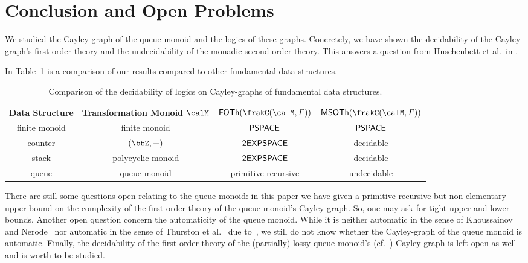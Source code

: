 \section{Conclusion and Open Problems}
We studied the Cayley-graph of the queue monoid and the logics of these graphs. Concretely, we have shown the decidability of the Cayley-graph's first order theory and the undecidability of the monadic second-order theory. This answers a question from Huschenbett et al.\ in \cite{HusKZ17}.

In Table~\ref{tab:conclusion} is a comparison of our results compared to other fundamental data structures.

\begin{table}[h]
	\begin{tabular}{cc|cc}
		Data Structure & Transformation Monoid $\calM$ & $\FOTh{\cayley{\calM}{\varGamma}}$ & $\MSOTh{\cayley{\calM}{\varGamma}}$\\
		\hline
		\hline
		finite monoid & finite monoid & $\mathsf{PSPACE}$ \cite{Graedel03} & $\mathsf{PSPACE}$ \cite{Graedel03}\\
		counter & $(\bbZ,+)$ & $\mathsf{2EXPSPACE}$ \cite{KusL11} & decidable \cite{KusL06}\\
		stack & polycyclic monoid & $\mathsf{2EXPSPACE}$ \cite{KusL11} & decidable \cite{DelKT03,KusL06}\\
		queue & queue monoid & primitive recursive & undecidable
	\end{tabular}
	\caption{Comparison of the decidability of logics on Cayley-graphs of fundamental data structures.\label{tab:conclusion}}
\end{table}\vspace{-1cm}
There are still some questions open relating to the queue monoid: in this paper we have given a primitive recursive but non-elementary upper bound on the complexity of the first-order theory of the queue monoid's Cayley-graph. So, one may ask for tight upper and lower bounds.
Another open question concern the automaticity of the queue monoid. While it is neither automatic in the sense of Khoussainov and Nerode~\cite{KN95} nor automatic in the sense of Thurston et al.~\cite{CEHLPT92} due to~\cite{HusKZ17}, we still do not know whether the Cayley-graph of the queue monoid is automatic.
Finally, the decidability of the first-order theory of the (partially) lossy queue monoid's (cf.~\cite{KKP18,Koe18}) Cayley-graph is left open as well and is worth to be studied.